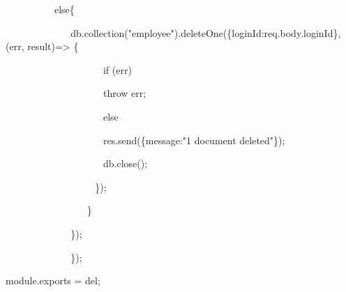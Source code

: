 \documentclass[
]{article}
\begin{document}
{~ ~ ~ ~ ~ ~ }else\{

{~ ~ ~ ~ ~ ~ ~ ~
}db.collection("employee").deleteOne(\{loginId:req.body.loginId\}, (err,
result)=\textgreater{} \{

{~ ~ ~ ~ ~ ~ ~ ~ ~ ~ ~ ~ }if (err){~}

{~ ~ ~ ~ ~ ~ ~ ~ ~ ~ ~ ~ }throw err;

{~ ~ ~ ~ ~ ~ ~ ~ ~ ~ ~ ~ }else

{~ ~ ~ ~ ~ ~ ~ ~ ~ ~ ~ ~ }res.send(\{message:"1 document deleted"\});

{~ ~ ~ ~ ~ ~ ~ ~ ~ ~ ~ ~ }db.close();

{~ ~ ~ ~ ~ ~ ~ ~ ~ ~ ~ }\});

{~ ~ ~ ~ ~ ~ ~ ~ ~ ~ }\}

{~ ~ ~ ~ ~ ~ ~ ~ }\});

{~ ~ ~ ~ ~ ~ ~ ~ }\});

\hfill    

module.exports = del;

\hfill    
\end{document}

